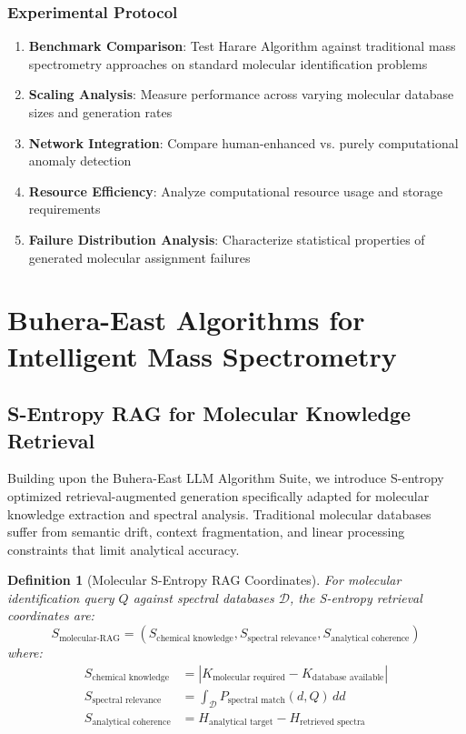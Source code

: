 \documentclass[11pt,a4paper]{article}
\newtheorem{definition}[theorem]{Definition}
\theoremstyle{remark}
\begin{document}
\subsubsection{Experimental Protocol}

\begin{enumerate}
\item \textbf{Benchmark Comparison}: Test Harare Algorithm against traditional mass spectrometry approaches on standard molecular identification problems
\item \textbf{Scaling Analysis}: Measure performance across varying molecular database sizes and generation rates
\item \textbf{Network Integration}: Compare human-enhanced vs. purely computational anomaly detection
\item \textbf{Resource Efficiency}: Analyze computational resource usage and storage requirements
\item \textbf{Failure Distribution Analysis}: Characterize statistical properties of generated molecular assignment failures
\end{enumerate}

\section{Buhera-East Algorithms for Intelligent Mass Spectrometry}

\subsection{S-Entropy RAG for Molecular Knowledge Retrieval}

Building upon the Buhera-East LLM Algorithm Suite, we introduce S-entropy optimized retrieval-augmented generation specifically adapted for molecular knowledge extraction and spectral analysis. Traditional molecular databases suffer from semantic drift, context fragmentation, and linear processing constraints that limit analytical accuracy.

\begin{definition}[Molecular S-Entropy RAG Coordinates]
For molecular identification query $Q$ against spectral databases $\mathcal{D}$, the S-entropy retrieval coordinates are:
\begin{equation}
S_{\text{molecular-RAG}} = (S_{\text{chemical knowledge}}, S_{\text{spectral relevance}}, S_{\text{analytical coherence}})
\end{equation}
where:
\begin{align}
S_{\text{chemical knowledge}} &= |K_{\text{molecular required}} - K_{\text{database available}}|\\
S_{\text{spectral relevance}} &= \int_{\mathcal{D}} P_{\text{spectral match}}(d, Q) \, dd\\
S_{\text{analytical coherence}} &= H_{\text{analytical target}} - H_{\text{retrieved spectra}}
\end{align}
\end{definition}
\end{document}
